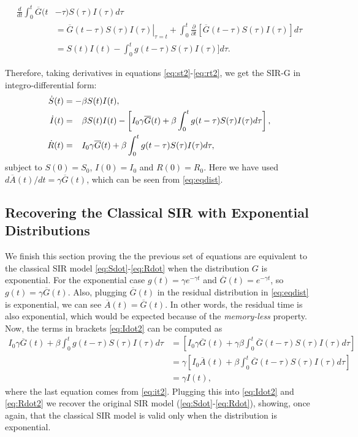 \documentclass[USenglish,10pt]{article}
\newcommand{\Ab}{\overline{A}\xspace}
\newcommand{\Gb}{\overline{G}\xspace}
\newcommand{\phm}{\ensuremath\phantom{-}\xspace}
\begin{document}
\begin{align*}
\frac{d}{dt}\int_0^t  \Gb(t & -\tau) S(\tau)I(\tau)d\tau \\
        & = \left. \Gb(t-\tau) S(\tau)I(\tau) \right|_{\tau=t}
             + \int_0^t \frac{\partial}{\partial t} [\Gb(t-\tau) S(\tau)I(\tau)]d\tau \\
        & = S(t)I(t) -  \int_0^t g(t-\tau) S(\tau)I(\tau)]d\tau.
\end{align*}

Therefore, taking derivatives in equations \eqref{eq:st2}-\eqref{eq:rt2}, we get the SIR-G in integro-differential form:
\begin{subequations}
	\begin{align}
		\dot S(t) &= -\beta S(t)I(t),
		\label{eq:Sdot2} \\
		\dot I(t) &= \phm  \beta  S(t)I(t) - \left[ I_0 \gamma \Gb(t) +  \beta\int_0^t g(t-\tau) S(\tau)I(\tau)d\tau \right],
		\label{eq:Idot2} \\
		\dot R(t) &= \phm I_0 \gamma \Gb(t) + \beta\int_0^t g(t-\tau) S(\tau)I(\tau)d\tau,
		\label{eq:Rdot2}
	\end{align}
\end{subequations}
subject to $S(0)=S_0$, $I(0)=I_0$ and $R(0)=R_0$.
Here we have used $d\Ab(t)/dt=\gamma\Gb(t)$, which  can be seen from \eqref{eq:eqdist}.


\subsection{Recovering the Classical SIR with Exponential Distributions}

We finish this section proving the the previous set of equations are equivalent to the classical SIR model \eqref{eq:Sdot}-\eqref{eq:Rdot} when the distribution $G$ is exponential.
For the exponential case  $g(t)=\gamma e^{-\gamma t}$ and $\Gb(t)=e^{-\gamma t}$, so $g(t)=\gamma\Gb(t)$. Also, plugging $\Gb(t)$ in the residual distribution in \eqref{eq:eqdist} is exponential, we can see $\Ab(t) = \Gb(t)$. In other words, the residual time is also exponential, which would be expected because of the \textit{memory-less} property.
Now, the terms in brackets \eqref{eq:Idot2} can be computed as
\begin{align*}
I_0 \gamma \Gb(t) + \beta\int_0^t g(t-\tau) S(\tau)I(\tau)d\tau
&= \left[ I_0  \gamma\Gb(t) + \gamma\beta\int_0^t \Gb(t-\tau) S(\tau)I(\tau)d\tau \right]\\
&= \gamma\left[ I_0  \Ab(t) + \beta\int_0^t \Gb(t-\tau) S(\tau)I(\tau)d\tau \right]\\
&= \gamma I(t),
\end{align*}
where the last equation comes from \eqref{eq:it2}.
Plugging this into \eqref{eq:Idot2} and \eqref{eq:Rdot2} we recover the original SIR model (\eqref{eq:Sdot}-\eqref{eq:Rdot}), showing, once again, that the classical SIR model is valid only when the distribution is exponential.
\end{document}

